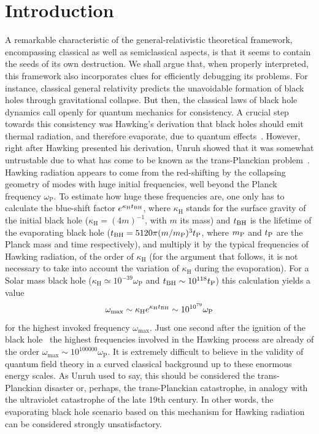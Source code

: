 \documentclass[11pt,a4paper]{article}
\begin{document}
\section{Introduction}
\label{Sec:Introduction}

A remarkable characteristic of the general-relativistic theoretical 
framework, encompassing classical as well as semiclassical aspects, is 
that it seems to contain the seeds of its own destruction. We shall argue that, 
when properly interpreted, this framework also incorporates clues for 
efficiently debugging its problems. For instance, 
classical general relativity predicts the unavoidable formation of black holes
through gravitational collapse.  But then, the classical laws of black hole
dynamics call openly for quantum mechanics for consistency. A crucial step
towards this consistency was  Hawking's derivation that black holes should emit
thermal radiation, and therefore evaporate, due to quantum
effects~\cite{hawking1, hawking2}. However, right after Hawking presented his derivation,  
Unruh showed that it was somewhat untrustable due to what has come to be known
as the trans-Planckian problem~\cite{unruh-notes}.  Hawking radiation appears to
come from the red-shifting  by the collapsing geometry of modes with huge initial
frequencies, well beyond the Planck frequency $\omega_\text{P}$.  To estimate
how huge these frequencies are, one only has to calculate the blue-shift factor
$e^{\kappa_\text{H} t_{\rm BH}}$, where $\kappa_\text{H}$ stands for the surface gravity  of the
initial black hole ($\kappa_\text{H}=(4m)^{-1}$, with $m$ its mass) and $t_{\rm BH}$ is the lifetime of the evaporating black hole ($t_{\rm BH}=5120\pi (m/m_\text{P})^3 t_{\rm P}$, where $m_{\rm P}$ and $t_{\rm P}$ are the Planck mass and time respectively), and multiply it by the typical
frequencies of Hawking radiation, of the order of $\kappa_\text{H}$ (for the argument that follows, it is not necessary to take into account the variation of $\kappa_\text{H}$ during the evaporation).  For a Solar mass
black hole ($\kappa_\text{H}\simeq10^{-39} \omega_\text{P}$ and $t_{\rm BH} \sim10^{118}t_{\rm P}$) this calculation yields a value 
\begin{equation}
\omega_\text{max} 
\sim\kappa_\text{H}e^{\kappa_\text{H} t_{\rm BH}}\sim 10^{10^{79}}\omega_\text{P}
\end{equation}
for the highest invoked frequency $\omega_\text{max}$. 
Just one second after the ignition of the black
hole~\cite{barbado} the highest frequencies involved in the Hawking process are already
of the order $\omega_\text{max}  \sim 10^{100000}\omega_\text{P}$.  It is
extremely difficult to believe in the validity of quantum field theory in a
curved classical background up to these enormous energy scales.  As Unruh used
to say, this should be considered the trans-Planckian disaster or, perhaps, the
trans-Planckian catastrophe, in analogy with the ultraviolet catastrophe of the
late 19th century. In other words,
the evaporating black hole scenario based on this mechanism for Hawking radiation can
be considered strongly unsatisfactory.  
\end{document}
